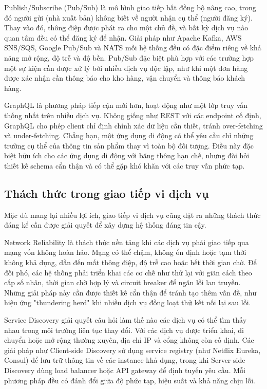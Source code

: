 Publish/Subscribe (Pub/Sub) là mô hình giao tiếp bất đồng bộ nâng cao, trong đó người gửi (nhà xuất bản) không biết về người nhận cụ thể (người đăng ký). Thay vào đó, thông điệp được phát ra cho một chủ đề, và bất kỳ dịch vụ nào quan tâm đều có thể đăng ký để nhận. Giải pháp như Apache Kafka, AWS SNS/SQS, Google Pub/Sub và NATS mỗi hệ thống đều có đặc điểm riêng về khả năng mở rộng, độ trễ và độ bền. Pub/Sub đặc biệt phù hợp với các trường hợp một sự kiện cần được xử lý bởi nhiều dịch vụ độc lập, như khi một đơn hàng được xác nhận cần thông báo cho kho hàng, vận chuyển và thông báo khách hàng.

GraphQL là phương pháp tiếp cận mới hơn, hoạt động như một lớp truy vấn thống nhất trên nhiều dịch vụ. Không giống như REST với các endpoint cố định, GraphQL cho phép client chỉ định chính xác dữ liệu cần thiết, tránh over-fetching và under-fetching. Chẳng hạn, một ứng dụng di động có thể yêu cầu chỉ những trường cụ thể của thông tin sản phẩm thay vì toàn bộ đối tượng. Điều này đặc biệt hữu ích cho các ứng dụng di động với băng thông hạn chế, nhưng đòi hỏi thiết kế schema cẩn thận và có thể gặp khó khăn với các truy vấn phức tạp.

\subsection{Thách thức trong giao tiếp vi dịch vụ}
Mặc dù mang lại nhiều lợi ích, giao tiếp vi dịch vụ cũng đặt ra những thách thức đáng kể cần được giải quyết để xây dựng hệ thống đáng tin cậy.

Network Reliability là thách thức nền tảng khi các dịch vụ phải giao tiếp qua mạng vốn không hoàn hảo. Mạng có thể chậm, không ổn định hoặc tạm thời không khả dụng, dẫn đến mất thông điệp, độ trễ cao hoặc hết thời gian chờ. Để đối phó, các hệ thống phải triển khai các cơ chế như thử lại với giãn cách theo cấp số nhân, thời gian chờ hợp lý và circuit breaker để ngăn lỗi lan truyền. Những giải pháp này cần được thiết kế cẩn thận để tránh tạo thêm vấn đề, như hiệu ứng "thundering herd" khi nhiều dịch vụ đồng loạt thử kết nối lại sau lỗi.

Service Discovery giải quyết câu hỏi làm thế nào các dịch vụ có thể tìm thấy nhau trong môi trường liên tục thay đổi. Với các dịch vụ được triển khai, di chuyển hoặc mở rộng thường xuyên, địa chỉ IP và cổng không còn cố định. Các giải pháp như Client-side Discovery sử dụng service registry (như Netflix Eureka, Consul) để lưu trữ thông tin về các instance khả dụng, trong khi Server-side Discovery dùng load balancer hoặc API gateway để định tuyến yêu cầu. Mỗi phương pháp đều có đánh đổi giữa độ phức tạp, hiệu suất và khả năng chịu lỗi.

